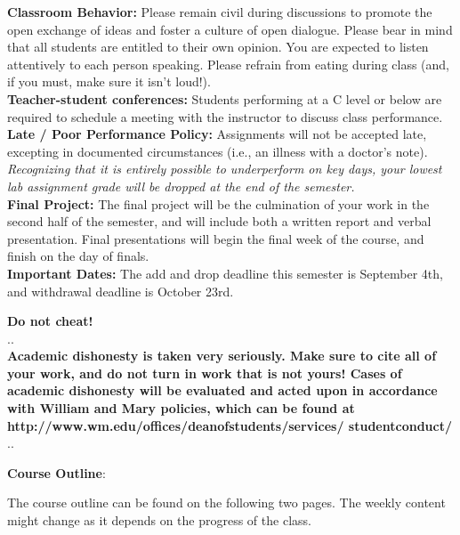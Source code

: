 \documentclass[11pt]{article}
\begin{document}
\textbf {\large Classroom Behavior:} Please remain civil during discussions to promote the open exchange of ideas and foster a culture of open dialogue.  Please bear in mind that all students are entitled to their own opinion.  You are expected to listen attentively to each person speaking.  Please refrain from eating during class (and, if you must, make sure it isn't loud!).\\

\textbf {\large Teacher-student conferences:} Students performing at a C level or below are required to schedule a meeting with the instructor to discuss class performance.\\

\textbf {\large Late / Poor Performance Policy:} Assignments will not be accepted late, excepting in documented circumstances (i.e., an illness with a doctor's note).  \textit{Recognizing that it is entirely possible to underperform on key days, your lowest lab assignment grade will be dropped at the end of the semester.}\\

\textbf {\large Final Project:} The final project will be the culmination of your work in the second half of the semester, and will include both a written report and verbal presentation.  Final presentations will begin the final week of the course, and finish on the day of finals. \\

\textbf {\large Important Dates:} The add and drop deadline this semester is September 4th, and withdrawal deadline is October 23rd.

\vspace{4mm}
\textbf {\LARGE Do not cheat!} \\
.\hrulefill . \\
\textbf{Academic dishonesty is taken very seriously.  Make sure to cite all of your work, and do not turn in work that is not yours!  Cases of academic dishonesty will be evaluated and acted upon in accordance with William and Mary policies, which can be found at http://www.wm.edu/offices/deanofstudents/services/
studentconduct/} \\
.\hrulefill . \\
\vspace{8mm}

\textbf {\large Course Outline}:

The course outline can be found on the following two pages.  The weekly content might change as it depends on the progress of the class.
\end{document}
